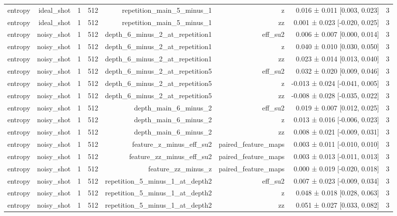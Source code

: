 \begin{table}
\begin{tabular}{lrrrrrrr}
entropy & ideal\_shot & 1 & 512 & repetition\_main\_5\_minus\_1 & z & 0.016 ± 0.011 [0.003, 0.023] & 3 \\
entropy & ideal\_shot & 1 & 512 & repetition\_main\_5\_minus\_1 & zz & 0.001 ± 0.023 [-0.020, 0.025] & 3 \\
entropy & noisy\_shot & 1 & 512 & depth\_6\_minus\_2\_at\_repetition1 & eff\_su2 & 0.006 ± 0.007 [0.000, 0.014] & 3 \\
entropy & noisy\_shot & 1 & 512 & depth\_6\_minus\_2\_at\_repetition1 & z & 0.040 ± 0.010 [0.030, 0.050] & 3 \\
entropy & noisy\_shot & 1 & 512 & depth\_6\_minus\_2\_at\_repetition1 & zz & 0.023 ± 0.014 [0.013, 0.040] & 3 \\
entropy & noisy\_shot & 1 & 512 & depth\_6\_minus\_2\_at\_repetition5 & eff\_su2 & 0.032 ± 0.020 [0.009, 0.046] & 3 \\
entropy & noisy\_shot & 1 & 512 & depth\_6\_minus\_2\_at\_repetition5 & z & -0.013 ± 0.024 [-0.041, 0.005] & 3 \\
entropy & noisy\_shot & 1 & 512 & depth\_6\_minus\_2\_at\_repetition5 & zz & -0.008 ± 0.028 [-0.035, 0.022] & 3 \\
entropy & noisy\_shot & 1 & 512 & depth\_main\_6\_minus\_2 & eff\_su2 & 0.019 ± 0.007 [0.012, 0.025] & 3 \\
entropy & noisy\_shot & 1 & 512 & depth\_main\_6\_minus\_2 & z & 0.013 ± 0.016 [-0.006, 0.023] & 3 \\
entropy & noisy\_shot & 1 & 512 & depth\_main\_6\_minus\_2 & zz & 0.008 ± 0.021 [-0.009, 0.031] & 3 \\
entropy & noisy\_shot & 1 & 512 & feature\_z\_minus\_eff\_su2 & paired\_feature\_maps & 0.003 ± 0.011 [-0.010, 0.010] & 3 \\
entropy & noisy\_shot & 1 & 512 & feature\_zz\_minus\_eff\_su2 & paired\_feature\_maps & 0.003 ± 0.013 [-0.011, 0.013] & 3 \\
entropy & noisy\_shot & 1 & 512 & feature\_zz\_minus\_z & paired\_feature\_maps & 0.000 ± 0.019 [-0.020, 0.018] & 3 \\
entropy & noisy\_shot & 1 & 512 & repetition\_5\_minus\_1\_at\_depth2 & eff\_su2 & 0.007 ± 0.023 [-0.009, 0.034] & 3 \\
entropy & noisy\_shot & 1 & 512 & repetition\_5\_minus\_1\_at\_depth2 & z & 0.048 ± 0.018 [0.028, 0.063] & 3 \\
entropy & noisy\_shot & 1 & 512 & repetition\_5\_minus\_1\_at\_depth2 & zz & 0.051 ± 0.027 [0.033, 0.082] & 3 \\

\end{tabular}
\end{table}
